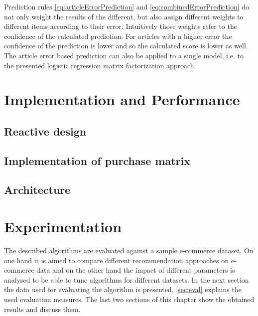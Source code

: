 \documentclass[10pt]{reportMaster}
\begin{document}
Prediction rules \ref{eq:articleErrorPrediction} and \ref{eq:combinedErrorPrediction} do not only weight the results of the different, but also assign different weights to different items according to their error.
Intuitively those weights refer to the confidence of the calculated prediction.
For articles with a higher error the confidence of the prediction is lower and so the calculated score is lower as well.
The article error based prediction can also be applied to a single model, i.e. to the presented logistic regression matrix factorization approach.















\chapter{Implementation and Performance}

\section{Reactive design}

\section{Implementation of purchase matrix}

\section{Architecture}








\chapter{Experimentation}
\label{chap:experimentation}
The described algorithms are evaluated against a sample e-commerce dataset.
On one hand it is aimed to compare different recommendation approaches on e-commerce data and on the other hand the impact of different parameters is analysed to be able to tune algorithms for different datasets.
In the next section the data used for evaluating the algorithm is presented.
\ref{sec:eval} explains the used evaluation measures.
The last two sections of this chapter show the obtained results and discuss them.
\end{document}
